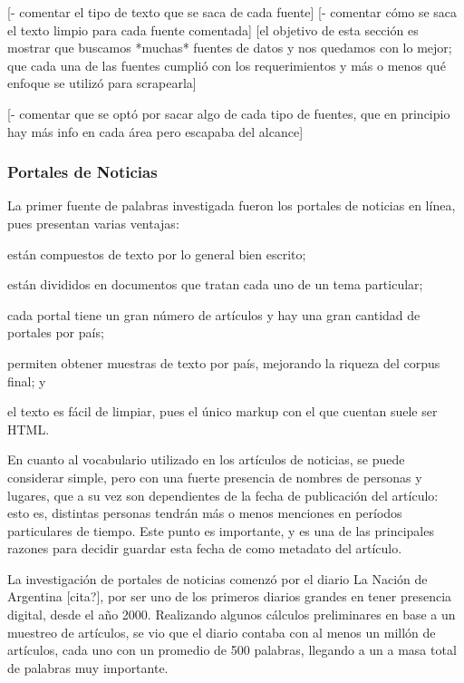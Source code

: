 [- comentar el tipo de texto que se saca de cada fuente]
[- comentar cómo se saca el texto limpio para cada fuente comentada]
[el objetivo de esta sección es mostrar que buscamos *muchas* fuentes de datos y nos quedamos con lo
mejor; que cada una de las fuentes cumplió con los requerimientos y más o menos qué enfoque se
utilizó para scrapearla]

[- comentar que se optó por sacar algo de cada tipo de fuentes, que en principio hay más info en cada área pero escapaba del alcance]


\subsubsection{Portales de Noticias}

La primer fuente de palabras investigada fueron los portales de noticias en línea, pues presentan
varias ventajas:\begin{inparaenum}[(a)]
\item están compuestos de texto por lo general bien escrito;
\item están divididos en documentos que tratan cada uno de un tema particular;
\item cada portal tiene un gran número de artículos y hay una gran cantidad de portales por país;
\item permiten obtener muestras de texto por país, mejorando la riqueza del corpus final; y
\item el texto es fácil de limpiar, pues el único markup con el que cuentan suele ser HTML\@.
\end{inparaenum}

En cuanto al vocabulario utilizado en los artículos de noticias, se puede considerar simple, pero
con una fuerte presencia de nombres de personas y lugares, que a su vez son dependientes de la fecha
de publicación del artículo: esto es, distintas personas tendrán más o menos menciones en períodos
particulares de tiempo. Este punto es importante, y es una de las principales razones para decidir
guardar esta fecha de como metadato del artículo.


La investigación de portales de noticias comenzó por el diario La Nación de Argentina [cita?], por
ser uno de los primeros diarios grandes en tener presencia digital, desde el año 2000. Realizando
algunos cálculos preliminares en base a un muestreo de artículos, se vio que el diario contaba con
al menos un millón de artículos, cada uno con un promedio de 500 palabras, llegando a un a masa total
de palabras muy importante.

